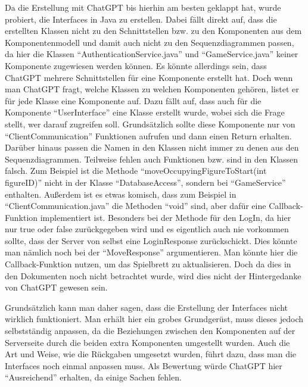 Da die Erstellung mit ChatGPT bis hierhin am besten geklappt hat, wurde probiert, die Interfaces in Java zu erstellen. Dabei fällt 
direkt auf, dass die erstellten Klassen nicht zu den Schnittstellen bzw. zu den Komponenten aus dem Komponentenmodell und damit auch 
nicht zu den Sequenzdiagrammen passen, da hier die Klassen ``AuthenticationService.java'' und ``GameService.java'' keiner Komponente 
zugewiesen werden können. Es könnte allerdings sein, dass ChatGPT mehrere Schnittstellen für eine Komponente erstellt hat. Doch wenn 
man ChatGPT fragt, welche Klassen zu welchen Komponenten gehören, listet er für jede Klasse eine Komponente auf. Dazu fällt auf, dass 
auch für die Komponente ``UserInterface'' eine Klasse erstellt wurde, wobei sich die Frage stellt, wer darauf zugreifen soll. 
Grundsätzlich sollte diese Komponente nur von ``ClientCommunication'' Funktionen aufrufen und dann einen Return erhalten. Darüber hinaus 
passen die Namen in den Klassen nicht immer zu denen aus den Sequenzdiagrammen. Teilweise fehlen auch Funktionen bzw. sind in den 
Klassen falsch. Zum Beispiel ist die Methode ``moveOccupyingFigureToStart(int figureID)'' nicht in der Klasse ``DatabaseAccess'', sondern 
bei ``GameService'' enthalten. Außerdem ist es etwas komisch, dass zum Beispiel in ``ClientCommunication.java'' die Methoden ``void'' sind, 
aber dafür eine Callback-Funktion implementiert ist. Besonders bei der Methode für den LogIn, da hier nur true oder false 
zurückgegeben wird und es eigentlich auch nie vorkommen sollte, dass der Server von selbst eine LoginResponse zurückschickt. Dies 
könnte man nämlich noch bei der ``MoveResponse'' argumentieren. Man könnte hier die Callback-Funktion nutzen, um das Spielbrett 
zu aktualisieren. Doch da dies in den Dokumenten noch nicht betrachtet wurde, wird dies nicht der Hintergedanke von 
ChatGPT gewesen sein.

Grundsätzlich kann man daher sagen, dass die Erstellung der Interfaces nicht wirklich funktioniert. Man erhält hier ein grobes 
Grundgerüst, muss dieses jedoch selbstständig anpassen, da die Beziehungen zwischen den Komponenten auf der Serverseite durch die 
beiden extra Komponenten umgestellt wurden. Auch die Art und Weise, wie die Rückgaben umgesetzt wurden, führt dazu, dass man die 
Interfaces noch einmal anpassen muss. Als Bewertung würde ChatGPT hier ``Ausreichend'' erhalten, da einige Sachen fehlen.
